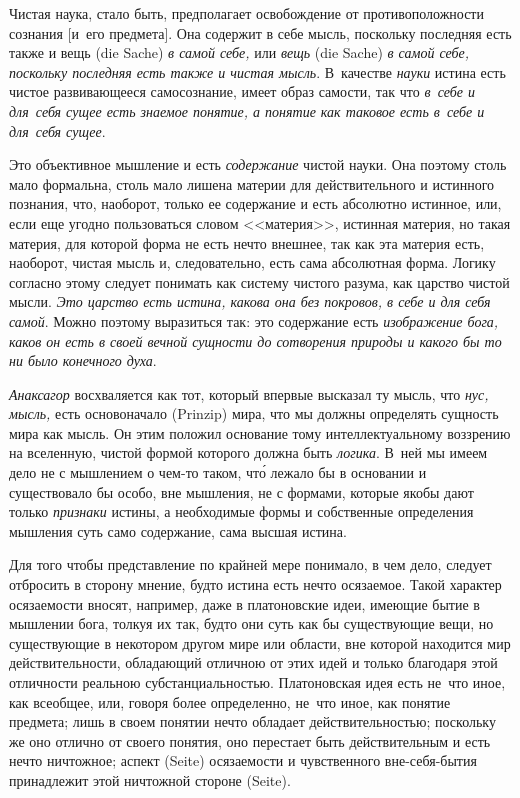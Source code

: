 Чистая наука, стало быть, предполагает освобождение от противоположности
сознания [и~его предмета]. Она содержит в себе мысль, поскольку последняя
есть также и вещь (die Sache) {\em в самой себе,} или
{\em вещь} (die Sache) {\em в самой себе, поскольку последняя есть также
и чистая мысль}. В~качестве {\em науки} истина есть чистое развивающееся
самосознание, имеет образ самости, так что {\em в~себе и для~себя сущее
есть знаемое понятие, а понятие как таковое есть в~себе и для~себя сущее}.

Это объективное мышление и есть {\em содержание} чистой
науки. Она поэтому столь мало формальна, столь мало лишена материи для
действительного и истинного познания, что, наоборот, только ее содержание и
есть абсолютно истинное, или, если еще угодно пользоваться словом
<<материя>>, истинная материя, но такая материя, для которой форма не есть
нечто внешнее, так как эта материя есть, наоборот, чистая мысль и,
следовательно, есть сама абсолютная форма. Логику согласно этому следует
понимать как систему чистого разума, как царство чистой мысли.
{\em Это царство есть истина, какова она без покровов,
в себе и для себя самой}. Можно поэтому выразиться так: это содержание есть
{\em изображение бога, каков он есть в своей вечной
сущности до сотворения природы и какого бы то ни было конечного духа}.

{\em Анаксагор} восхваляется как тот, который впервые
высказал ту мысль, что {\em нус,}
{\em мысль,} есть основоначало (Prinzip) мира, что мы
должны определять сущность мира как мысль. Он этим положил основание тому
интеллектуальному воззрению на вселенную, чистой формой которого должна
быть {\em логика}. В~ней мы имеем дело не с мышлением о
чем-то таком, чт\'{о} лежало бы в основании и существовало бы особо, вне
мышления, не с формами, которые якобы дают только
{\em признаки} истины, а необходимые формы и
собственные определения мышления суть само содержание, сама высшая истина.

Для того чтобы представление по крайней мере понимало, в чем дело, следует
отбросить в сторону мнение, будто истина есть нечто осязаемое. Такой
характер осязаемости вносят, например, даже в платоновские идеи, имеющие
бытие в мышлении бога, толкуя их так, будто они суть как бы существующие
вещи, но существующие в некотором другом мире или области, вне которой
находится мир действительности, обладающий отличною от этих идей и только
благодаря этой отличности реальною субстанциальностью. Платоновская идея
есть не~что иное, как всеобщее, или, говоря более определенно, не~что иное,
как понятие предмета; лишь в своем понятии нечто обладает
действительностью; поскольку же оно отлично от своего понятия, оно
перестает быть действительным и есть нечто ничтожное; аспект (Seite)
осязаемости и чувственного вне-себя-бытия принадлежит этой ничтожной
стороне (Seite).

